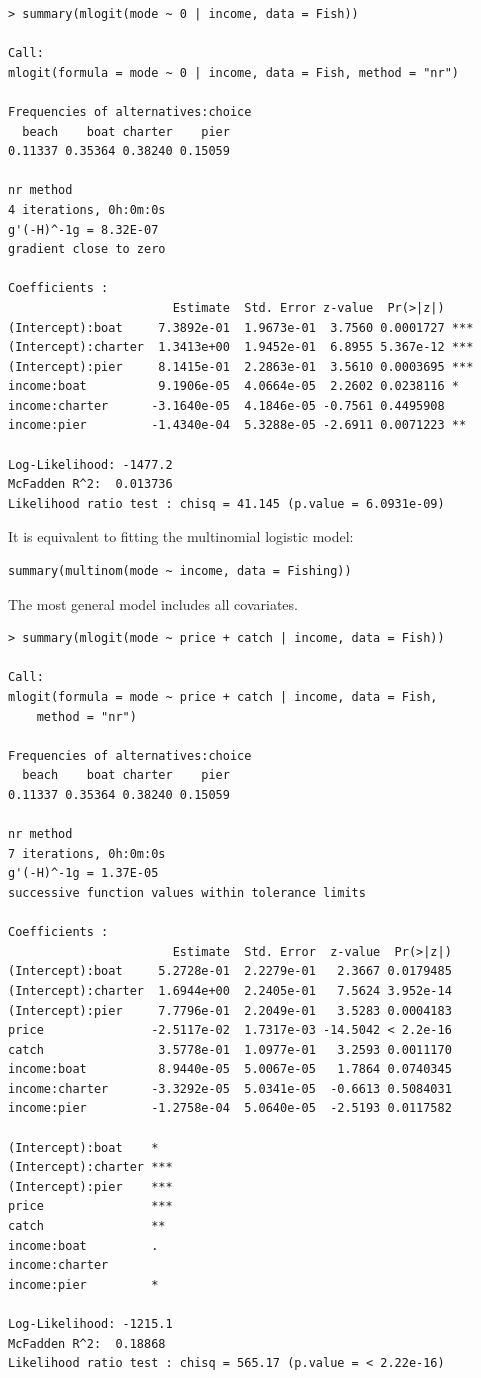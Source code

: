 \begin{lstlisting}
> summary(mlogit(mode ~ 0 | income, data = Fish))

Call:
mlogit(formula = mode ~ 0 | income, data = Fish, method = "nr")

Frequencies of alternatives:choice
  beach    boat charter    pier 
0.11337 0.35364 0.38240 0.15059 

nr method
4 iterations, 0h:0m:0s 
g'(-H)^-1g = 8.32E-07 
gradient close to zero 

Coefficients :
                       Estimate  Std. Error z-value  Pr(>|z|)    
(Intercept):boat     7.3892e-01  1.9673e-01  3.7560 0.0001727 ***
(Intercept):charter  1.3413e+00  1.9452e-01  6.8955 5.367e-12 ***
(Intercept):pier     8.1415e-01  2.2863e-01  3.5610 0.0003695 ***
income:boat          9.1906e-05  4.0664e-05  2.2602 0.0238116 *  
income:charter      -3.1640e-05  4.1846e-05 -0.7561 0.4495908    
income:pier         -1.4340e-04  5.3288e-05 -2.6911 0.0071223 ** 

Log-Likelihood: -1477.2
McFadden R^2:  0.013736 
Likelihood ratio test : chisq = 41.145 (p.value = 6.0931e-09)
\end{lstlisting}

It is equivalent to fitting the multinomial logistic model:

\begin{lstlisting}
summary(multinom(mode ~ income, data = Fishing))
\end{lstlisting}

The most general model includes all covariates.

\begin{lstlisting}
> summary(mlogit(mode ~ price + catch | income, data = Fish))

Call:
mlogit(formula = mode ~ price + catch | income, data = Fish, 
    method = "nr")

Frequencies of alternatives:choice
  beach    boat charter    pier 
0.11337 0.35364 0.38240 0.15059 

nr method
7 iterations, 0h:0m:0s 
g'(-H)^-1g = 1.37E-05 
successive function values within tolerance limits 

Coefficients :
                       Estimate  Std. Error  z-value  Pr(>|z|)
(Intercept):boat     5.2728e-01  2.2279e-01   2.3667 0.0179485
(Intercept):charter  1.6944e+00  2.2405e-01   7.5624 3.952e-14
(Intercept):pier     7.7796e-01  2.2049e-01   3.5283 0.0004183
price               -2.5117e-02  1.7317e-03 -14.5042 < 2.2e-16
catch                3.5778e-01  1.0977e-01   3.2593 0.0011170
income:boat          8.9440e-05  5.0067e-05   1.7864 0.0740345
income:charter      -3.3292e-05  5.0341e-05  -0.6613 0.5084031
income:pier         -1.2758e-04  5.0640e-05  -2.5193 0.0117582
                       
(Intercept):boat    *  
(Intercept):charter ***
(Intercept):pier    ***
price               ***
catch               ** 
income:boat         .  
income:charter         
income:pier         *  

Log-Likelihood: -1215.1
McFadden R^2:  0.18868 
Likelihood ratio test : chisq = 565.17 (p.value = < 2.22e-16)
\end{lstlisting}


